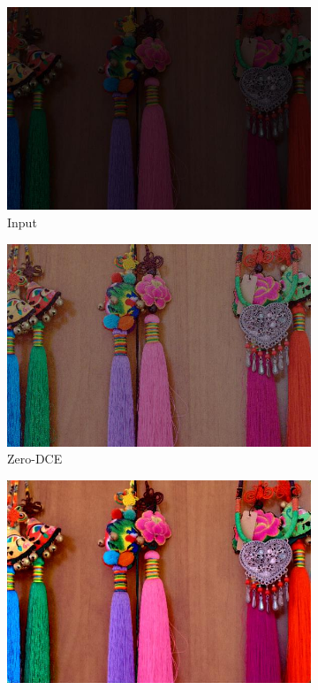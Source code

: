 \documentclass[a4paper, 10pt]{article}
\begin{document}
\begin{figure}[htb]
\begin{subfigure}{0.19\textwidth}
				\includegraphics[width=\linewidth]{picture/LLIE/Experiment/Input1}
				\captionsetup{font=scriptsize}
				\caption{Input}
				\label{fig: Input1}
			\end{subfigure}
			\begin{subfigure}{0.19\textwidth}
				\includegraphics[width=\linewidth]{picture/LLIE/Experiment/Zero-DCE1}				
				\captionsetup{font=scriptsize}
				\caption{Zero-DCE}
				\label{fig: Zero-DCE1}	
			\end{subfigure}
			\begin{subfigure}{0.19\textwidth}
				\includegraphics[width=\linewidth]{picture/LLIE/Experiment/MBLLEN1}

\end{subfigure}
\end{figure}
\end{document}
